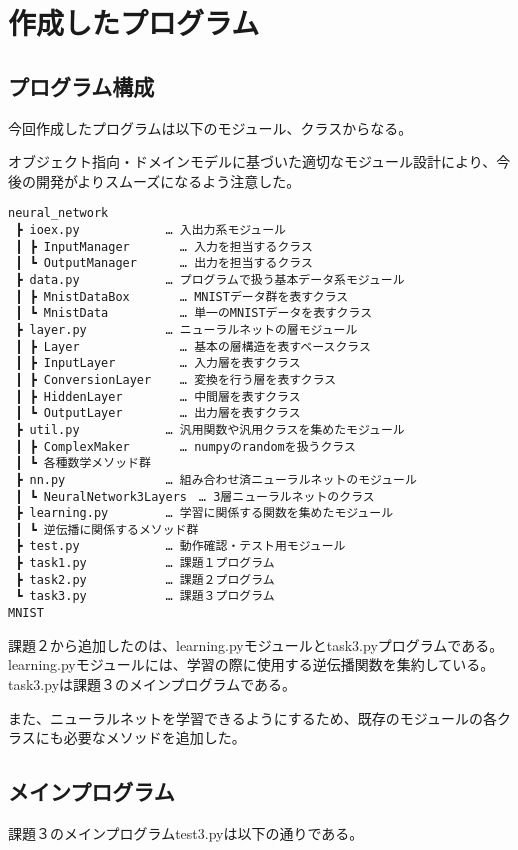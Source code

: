 \documentclass{ujarticle} %
\begin{document}
\section{作成したプログラム}
\subsection{プログラム構成}
今回作成したプログラムは以下のモジュール、クラスからなる。

オブジェクト指向・ドメインモデルに基づいた適切なモジュール設計により、今後の開発がよりスムーズになるよう注意した。

\begin{verbatim}
neural_network
 ┣ ioex.py            … 入出力系モジュール
 ┃ ┣ InputManager       … 入力を担当するクラス
 ┃ ┗ OutputManager      … 出力を担当するクラス
 ┣ data.py            … プログラムで扱う基本データ系モジュール
 ┃ ┣ MnistDataBox       … MNISTデータ群を表すクラス
 ┃ ┗ MnistData          … 単一のMNISTデータを表すクラス
 ┣ layer.py           … ニューラルネットの層モジュール
 ┃ ┣ Layer              … 基本の層構造を表すベースクラス
 ┃ ┣ InputLayer         … 入力層を表すクラス
 ┃ ┣ ConversionLayer    … 変換を行う層を表すクラス
 ┃ ┣ HiddenLayer        … 中間層を表すクラス
 ┃ ┗ OutputLayer        … 出力層を表すクラス
 ┣ util.py            … 汎用関数や汎用クラスを集めたモジュール
 ┃ ┣ ComplexMaker       … numpyのrandomを扱うクラス
 ┃ ┗ 各種数学メソッド群
 ┣ nn.py              … 組み合わせ済ニューラルネットのモジュール
 ┃ ┗ NeuralNetwork3Layers　… 3層ニューラルネットのクラス
 ┣ learning.py        … 学習に関係する関数を集めたモジュール
 ┃ ┗ 逆伝播に関係するメソッド群
 ┣ test.py            … 動作確認・テスト用モジュール
 ┣ task1.py           … 課題１プログラム
 ┣ task2.py           … 課題２プログラム
 ┗ task3.py           … 課題３プログラム
MNIST
\end{verbatim}

課題２から追加したのは、learning.pyモジュールとtask3.pyプログラムである。learning.pyモジュールには、学習の際に使用する逆伝播関数を集約している。task3.pyは課題３のメインプログラムである。

また、ニューラルネットを学習できるようにするため、既存のモジュールの各クラスにも必要なメソッドを追加した。

\subsection{メインプログラム}

課題３のメインプログラムtest3.pyは以下の通りである。
\end{document}
